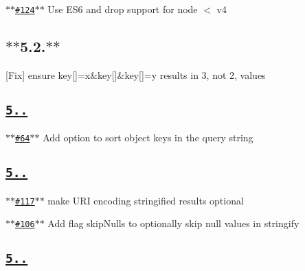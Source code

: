 \begin{DoxyItemize}
\item \href{https://github.com/ljharb/qs/issues/124}{\tt $\ast$$\ast$\#124$\ast$$\ast$} Use E\+S6 and drop support for node $<$ v4
\end{DoxyItemize}

\subsection*{$\ast$$\ast$5.2.$\ast$$\ast$}


\begin{DoxyItemize}
\item \mbox{[}Fix\mbox{]} ensure {\ttfamily key\mbox{[}\mbox{]}=x\&key\mbox{[}\mbox{]}\&key\mbox{[}\mbox{]}=y} results in 3, not 2, values
\end{DoxyItemize}

\subsection*{\href{https://github.com/ljharb/qs/issues?milestone=30&state=closed}{\tt {\bfseries 5..}}}


\begin{DoxyItemize}
\item \href{https://github.com/ljharb/qs/issues/64}{\tt $\ast$$\ast$\#64$\ast$$\ast$} Add option to sort object keys in the query string
\end{DoxyItemize}

\subsection*{\href{https://github.com/ljharb/qs/issues?milestone=29&state=closed}{\tt {\bfseries 5..}}}


\begin{DoxyItemize}
\item \href{https://github.com/ljharb/qs/issues/117}{\tt $\ast$$\ast$\#117$\ast$$\ast$} make U\+RI encoding stringified results optional
\item \href{https://github.com/ljharb/qs/issues/106}{\tt $\ast$$\ast$\#106$\ast$$\ast$} Add flag {\ttfamily skip\+Nulls} to optionally skip null values in stringify
\end{DoxyItemize}

\subsection*{\href{https://github.com/ljharb/qs/issues?milestone=28&state=closed}{\tt {\bfseries 5..}}}


